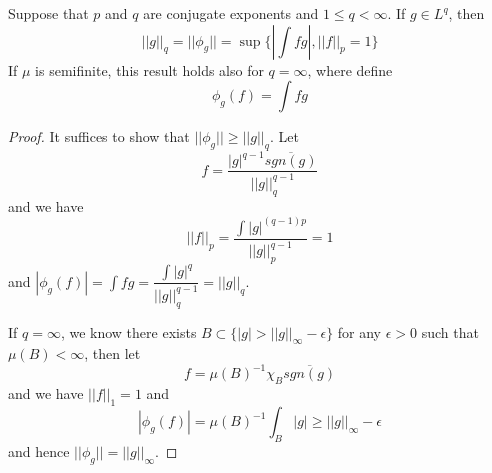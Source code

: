 \begin{proposition}
    Suppose that $p$ and $q$ are conjugate exponents and $1\leq q <\infty$. If $g\in L^q$, then
    \[||g||_q = ||\phi_g|| = \sup\{|\int fg|, ||f||_p = 1\}\]
    If $\mu$ is semifinite, this result holds also for $q=\infty$, where define
    \[\phi_g(f) = \int fg\]
\end{proposition}
\begin{proof}\par
    It suffices to show that $||\phi_g|| \geq ||g||_q$. Let
    \[
    f = \dfrac{|g|^{q-1}\overline{sgn(g)}}{||g||_q^{q-1}}
    \]
    and we have
    \[
    ||f||_p = \dfrac{\int |g|^{(q-1)p}}{||g||_p^{q-1}} = 1
    \]
    and $|\phi_g(f)| = \int fg = \dfrac{\int |g|^q}{||g||_q^{q-1}} = ||g||_q$.\par
    If $q=\infty$, we know there exists $B\subset \{|g|>||g||_{\infty} - \epsilon\}$ for any $\epsilon > 0$ such that $\mu(B) < \infty$, then let
    \[
    f = \mu(B)^{-1} \chi_B \overline{sgn(g)}
    \]
    and we have $||f||_1 = 1$ and
    \[
    |\phi_g(f)| = \mu(B)^{-1}\int_B|g| \geq ||g||_{\infty} - \epsilon
    \]
    and hence $||\phi_g|| = ||g||_{\infty}$.
\end{proof}

